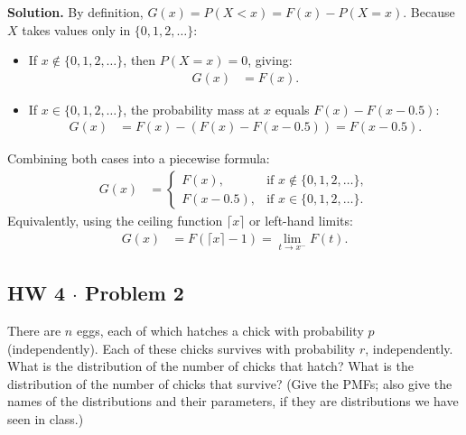 \documentclass[11pt,a4paper]{article}
\begin{document}
\noindent \textbf{Solution.} By definition, $G(x) = P(X < x) = F(x) - P(X = x)$. Because $X$ takes values only in $\{0, 1, 2, \dots\}$:
\begin{itemize}
    \item If $x \notin \{0, 1, 2, \dots\}$, then $P(X = x) = 0$, giving:
    \begin{align*}
    G(x) &= F(x).
    \end{align*}
    \item If $x \in \{0, 1, 2, \dots\}$, the probability mass at $x$ equals $F(x) - F(x - 0.5)$:
    \begin{align*}
    G(x) &= F(x) - \left( F(x) - F(x - 0.5) \right) = F(x - 0.5).
    \end{align*}
\end{itemize}
Combining both cases into a piecewise formula:
\begin{align*}
G(x) &= \begin{cases}
F(x), & \text{if } x \notin \{0, 1, 2, \dots\}, \\[6pt]
F(x - 0.5), & \text{if } x \in \{0, 1, 2, \dots\}.
\end{cases}
\end{align*}
Equivalently, using the ceiling function $\lceil x \rceil$ or left-hand limits:
\begin{align*}
G(x) &= F(\lceil x \rceil - 1) = \lim_{t \to x^-} F(t).
\end{align*}

\vspace{10pt}
\subsection{HW 4 $\cdot$ Problem 2}
\begin{tcolorbox}[title={HW 4 $\cdot$ Problem 2}]
There are $n$ eggs, each of which hatches a chick with probability $p$ (independently). Each of these chicks survives with probability $r$, independently. What is the distribution of the number of chicks that hatch? What is the distribution of the number of chicks that survive? (Give the PMFs; also give the names of the distributions and their parameters, if they are distributions we have seen in class.)
\end{tcolorbox}
\end{document}
